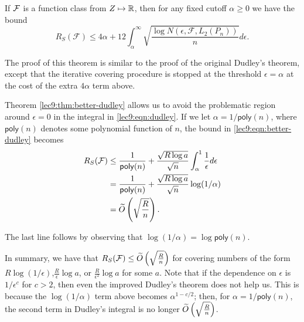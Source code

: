 \begin{enumerate}
\begin{theorem}\label{lec9:thm:better-dudley}
If $\mathcal F$ is a function class from $Z \mapsto \mathbb R$, then for any fixed cutoff $\alpha \geq 0$ we have the bound
\begin{equation}\label{lec9:eqn:better-dudley}
R_S(\mathcal{F})\leq 4\alpha + 12\int_{\alpha}^{\infty}\sqrt{\frac{\log N(\epsilon, \mathcal{F}, L_2(P_n))}{n}}d\epsilon.      
\end{equation}
\end{theorem}
The proof of this theorem is similar to the proof of the original Dudley's theorem, except that the iterative covering procedure is stopped at the threshold $\epsilon = \alpha$ at the cost of the extra $4\alpha$ term above.
        
Theorem \ref{lec9:thm:better-dudley} allows us to avoid the problematic region around $\epsilon=0$ in the integral in \eqref{lec9:eqn:dudley}. If we let $\alpha = 1/\mathsf{poly}(n)$, where $\mathsf{poly}(n)$ denotes some polynomial function of $n$, the bound in \eqref{lec9:eqn:better-dudley} becomes
\begin{align}
R_S(\mathcal{F}) &\leq \frac{1}{\mathsf{poly}(n)} + \frac{\sqrt{R\log a}}{\sqrt{n}}\int_{\alpha}^1\frac{1}{\epsilon}d\epsilon \\
&= \frac{1}{\mathsf{poly}(n)}  + \frac{\sqrt{R\log a}}{\sqrt{n}} \log(1/\alpha) \\
&= \widetilde{O} \left(\sqrt{\frac{R}{n}}\right). \label{lec9:eqn:rademacherbound_three}
\end{align}
\end{enumerate}
The last line follows by observing that $\log(1/\alpha) = \log \mathsf{poly}(n)$.

In summary, we have that $R_S(\mathcal{F}) \leq \widetilde{O}\left(\sqrt{\frac{R}{n}}\right)$ for covering numbers of the form $R\log (1/\epsilon)$,$\frac{R}{\epsilon} \log a$, or $\frac{R}{\epsilon^2} \log a$ for some $a$. Note that if the dependence on $\epsilon$ is $1/\epsilon^c$ for $c > 2$, then even the improved Dudley's theorem does not help us. This is because the $\log(1/\alpha)$ term above becomes $\alpha^{1-c/2}$; then, for $\alpha = 1/\mathsf{poly}(n)$, the second term in Dudley's integral is no longer $\widetilde{O} \left(\sqrt{\frac{R}{n}}\right )$.

